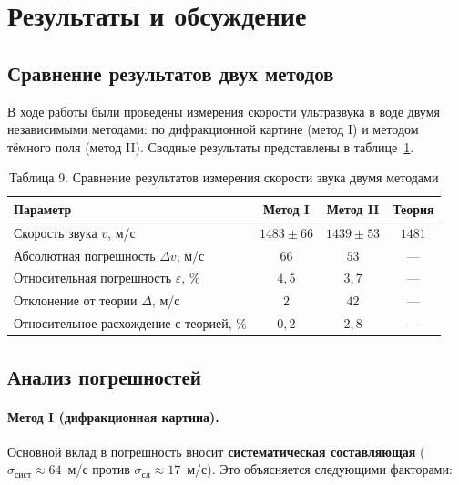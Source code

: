 \documentclass[a4paper]{article}
\begin{document}
\section{Результаты и обсуждение}

\subsection{Сравнение результатов двух методов}

В ходе работы были проведены измерения скорости ультразвука в воде двумя независимыми методами: по дифракционной картине (метод I) и методом тёмного поля (метод II). Сводные результаты представлены в таблице~\ref{tab:comparison}.

\begin{table}[h!]
\centering

\begin{tabular}{|l|c|c|c|}
\hline
Параметр & Метод I & Метод II & Теория \\
\hline
Скорость звука $v$, м/с & $1483 \pm 66$ & $1439 \pm 53$ & $1481$ \\ \hline
Абсолютная погрешность $\Delta v$, м/с & $66$ & $53$ & --- \\ \hline
Относительная погрешность $\varepsilon$, \% & $4{,}5$ & $3{,}7$ & --- \\ \hline
Отклонение от теории $\Delta$, м/с & $2$ & $42$ & --- \\ \hline
Относительное расхождение с теорией, \% & $0{,}2$ & $2{,}8$ & --- \\ \hline
\end{tabular}
\caption{Таблица 9. Сравнение результатов измерения скорости звука двумя методами}
\label{tab:comparison}
\end{table}

\subsection{Анализ погрешностей}

\paragraph{Метод I (дифракционная картина).} 
Основной вклад в погрешность вносит \textbf{систематическая составляющая} ($\sigma_{\text{сист}} \approx 64$~м/с против $\sigma_{\text{сл}} \approx 17$~м/с). Это объясняется следующими факторами:
\end{document}
